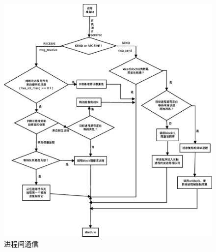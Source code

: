 \documentclass[UTF8,nofonts,cs4size]{ctexrep}
\begin{document}
\begin{figure}[htp]
\centering
\includegraphics[scale=0.34]{sendrecv.eps}
\caption{进程间通信}
\label{sendrecv}
\end{figure}
\end{document}
